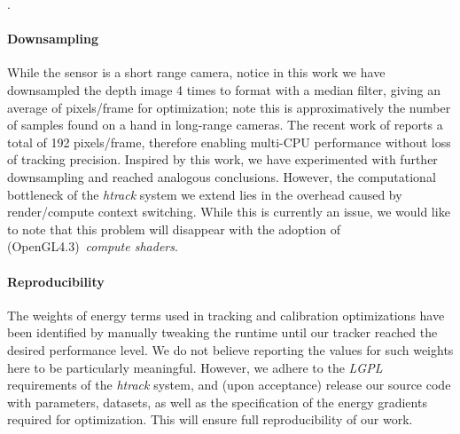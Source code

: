 .

\paragraph{Downsampling}
While the \realsense{} sensor is a short range camera, notice in this work we have downsampled the depth image 4 times to  format with a median filter, giving an average of  pixels/frame for optimization; note this is approximatively the number of samples found on a hand in long-range cameras. The recent work of \cite{taylor2016concerto} reports a total of 192 pixels/frame, therefore enabling multi-CPU performance without loss of tracking precision. Inspired by this work, we have experimented with further downsampling and reached analogous conclusions. However, the computational bottleneck of the \emph{htrack} system we extend lies in the overhead caused by render/compute context switching. While this is currently an issue, we would like to note that this problem will disappear with the adoption of (OpenGL4.3)~\emph{compute shaders}.

\paragraph{Reproducibility}
% 
The weights of energy terms used in tracking and calibration optimizations have been identified by manually tweaking the runtime until our tracker reached the desired performance level. We do not believe reporting the values for such weights here to be particularly meaningful. However, we adhere to the \emph{LGPL} requirements of the \emph{htrack} system, and (upon acceptance) release our source code with parameters, datasets, as well as the specification of the energy gradients required for optimization. This will ensure full reproducibility of our work.

